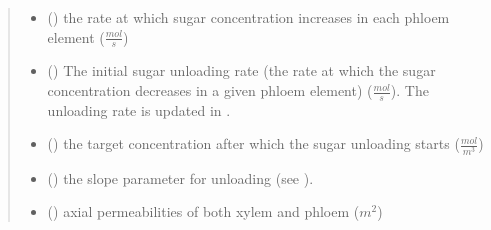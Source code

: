 \documentclass[letterpaper,10pt,english]{sphinxmanual}
\begin{document}
\begin{fulllineitems}
\begin{quote}
\begin{description}
\begin{itemize}
\item {} 
 (\sphinxstyleliteralemphasis{\sphinxupquote{{[}}}\sphinxstyleliteralemphasis{\sphinxupquote{{[}}}\sphinxstyleliteralemphasis{\sphinxupquote{{]}}}\sphinxstyleliteralemphasis{\sphinxupquote{{]} or }}) \textendash{} the rate at which sugar concentration increases
in each phloem element (\(\frac{mol}{s}\))

\item {} 
 (\sphinxstyleliteralemphasis{\sphinxupquote{{[}}}\sphinxstyleliteralemphasis{\sphinxupquote{{]} or }}) \textendash{} The initial sugar unloading rate (the rate at which the
sugar concentration decreases in a given phloem element) (\(\frac{mol}{s}\)). The unloading rate is
updated in .

\item {} 
 () \textendash{} the target concentration after which the sugar unloading
starts (\(\frac{mol}{m^3}\))

\item {} 
 () \textendash{} 
the slope parameter for unloading (see
).


\item {} 
 (\sphinxstyleliteralemphasis{\sphinxupquote{{[}}}\sphinxstyleliteralemphasis{\sphinxupquote{{[}}}\sphinxstyleliteralemphasis{\sphinxupquote{{]}}}\sphinxstyleliteralemphasis{\sphinxupquote{{]} or }}) \textendash{} axial permeabilities of both xylem and phloem
(\(m^2\))


\end{itemize}
\end{description}
\end{quote}
\end{fulllineitems}
\end{document}

